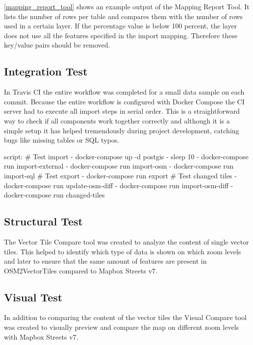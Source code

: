 \autoref{mapping_report_tool} shows an example output of the Mapping Report Tool. It lists the number of rows per table and compares them with the number of rows used in a certain layer. If the percentage value is below 100 percent, the layer does not use all the features specified in the import mapping. Therefore these \osm{} key/value pairs should be removed.

\subsection{Integration Test}

In Travis CI\cite{pm_5_travis-ci.org_2015} the entire workflow was completed for a small data sample on each commit.
Because the entire workflow is configured with Docker Compose \cite{pm_6_docs.docker.com_2015} the CI server had to execute all import steps in serial order. This is a straightforward way to check if all components work together correctly
and although it is a simple setup it has helped tremendously during project development, catching bugs
like missing tables or SQL typos.

\begin{yamlcode}
script:
  # Test import
  - docker-compose up -d postgis
  - sleep 10
  - docker-compose run import-external
  - docker-compose run import-osm
  - docker-compose run import-sql
  # Test export
  - docker-compose run export
  # Test changed tiles
  - docker-compose run update-osm-diff
  - docker-compose run import-osm-diff
  - docker-compose run changed-tiles
\end{yamlcode}

\subsection{Structural Test}

The Vector Tile Compare tool was created to analyze the content of single vector tiles. This helped to identify which type of data is shown on which zoom levels and later to ensure that the same amount of features are present in OSM2VectorTiles compared to Mapbox Streets v7.

\subsection{Visual Test}

In addition to comparing the content of the vector tiles the Visual Compare tool was created to visually preview and compare the map on different zoom levels with Mapbox Streets v7. 

